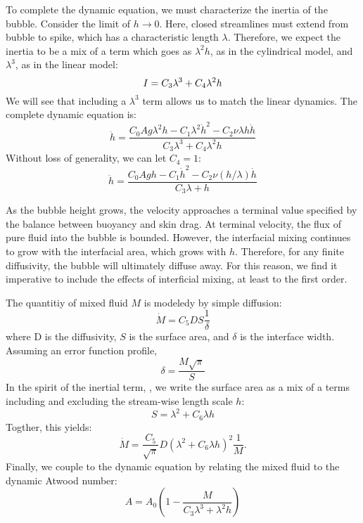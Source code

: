 To complete the dynamic equation, we must characterize the inertia of the bubble.
Consider the limit of $h \rightarrow 0$.  
Here, closed streamlines must extend from bubble to spike, which has a characteristic length $\lambda$.
Therefore, we expect the inertia to be a mix of a term which goes as $\lambda^2 h$, as in the cylindrical model, and $\lambda^3$, as in the linear model:
\begin{equation} \elabel{inertia}
I = C_3 \lambda^3 + C_4 \lambda^2 h
\end{equation}
We will see that including a $\lambda^3$ term allows us to match the linear dynamics.
The complete dynamic equation is:
\begin{equation}
\ddot{h} = \frac{C_0 A g \lambda^2 h - C_1 \lambda^2 \dot{h}^2 - C_2 \nu \lambda h \dot{h}}{C_3 \lambda^3 + C_4 \lambda^2 h}
\end{equation}
Without loss of generality, we can let $C_4 = 1$:
\begin{equation}
\ddot{h} = \frac{C_0 A g h - C_1 \dot{h}^2 - C_2 \nu (h/\lambda) \dot{h}}{C_3 \lambda + h}
\end{equation}

As the bubble height grows, the velocity approaches a terminal value specified by the balance between buoyancy and skin drag.
At terminal velocity, the flux of pure fluid into the bubble is bounded.
However, the interfacial mixing continues to grow with the interfacial area, which grows with $h$.
Therefore, for any finite diffusivity, the bubble will ultimately diffuse away.
For this reason, we find it imperative to include the effects of interficial mixing, at least to the first order.

The quantitiy of mixed fluid $M$ is modeledy by simple diffusion:
\begin{equation}
\dot{M} = C_5 D S \frac{1}{\delta}
\end{equation}
where D is the diffusivity,
$S$ is the surface area, and 
$\delta$ is the interface width.
Assuming an error function profile, 
\begin{equation}
\delta = \frac{M \sqrt{\pi}}{S}
\end{equation}
In the spirit of the inertial term, , we write the surface area as a mix of a terms including and excluding the stream-wise length scale $h$:
\begin{equation}
S = \lambda^2 + C_6 \lambda h
\end{equation}
Togther, this yields:
\begin{equation}
\dot{M} = \frac{C_5}{\sqrt{\pi}} D (\lambda^2 + C_6 \lambda h)^2 \frac{1}{M}.
\end{equation}
Finally, we couple to the dynamic equation by relating the mixed fluid to the dynamic Atwood number:
\begin{equation}
A = A_0 \left(1 - \frac{M}{C_3 \lambda^3 + \lambda^2 h} \right)
\end{equation}

